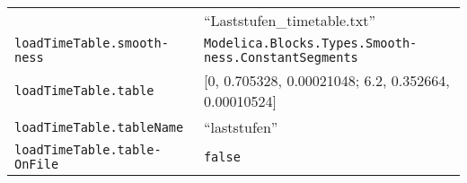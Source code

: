 \begin{longtable}[]{@{}ll@{}}
\begin{minipage}[t]{0.31\columnwidth}
\end{minipage} & \begin{minipage}[t]{0.63\columnwidth}\raggedright
``Laststufen\_timetable.txt''\strut
\end{minipage}\tabularnewline
\begin{minipage}[t]{0.31\columnwidth}\raggedright
\texttt{loadTimeTable.smooth­ness}\strut
\end{minipage} & \begin{minipage}[t]{0.63\columnwidth}\raggedright
\texttt{Modelica.­Blocks.­Types.­Smooth­ness.­ConstantSegments}\strut
\end{minipage}\tabularnewline
\begin{minipage}[t]{0.31\columnwidth}\raggedright
\texttt{loadTimeTable.table}\strut
\end{minipage} & \begin{minipage}[t]{0.63\columnwidth}\raggedright
{[}0, 0.705328, 0.00021048; 6.2, 0.352664, 0.00010524{]}\strut
\end{minipage}\tabularnewline
\begin{minipage}[t]{0.31\columnwidth}\raggedright
\texttt{loadTimeTable.tableName}\strut
\end{minipage} & \begin{minipage}[t]{0.63\columnwidth}\raggedright
``laststufen''\strut
\end{minipage}\tabularnewline
\begin{minipage}[t]{0.31\columnwidth}\raggedright
\texttt{loadTimeTable.table­OnFile}\strut
\end{minipage} & \begin{minipage}[t]{0.63\columnwidth}\raggedright
\texttt{false}\strut
\end{minipage}\tabularnewline
\bottomrule
\end{longtable}

